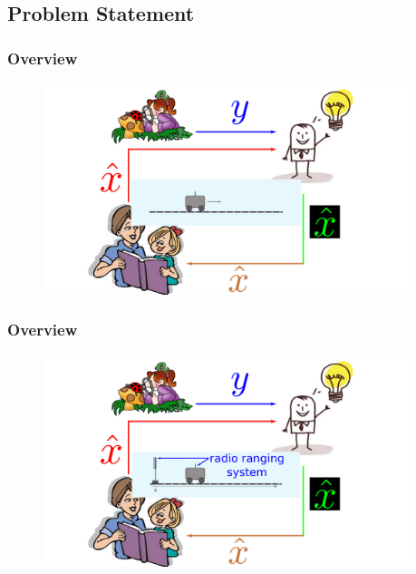 \subsection{Problem Statement}
\begin{frame}\pw\Large
\frametitle{Overview}
\framesubtitle{}
\begin{figure}
\includegraphics[width=0.95\textwidth]{figs/WFAR11_UCP_Update_Prediction_2_ProblemStatement-1.pdf}
\end{figure}
\end{frame}



\begin{frame}\pw\Large
\frametitle{Overview}
\framesubtitle{}
\begin{figure}
\includegraphics[width=0.95\textwidth]{figs/WFAR11_UCP_Update_Prediction_2_ProblemStatement-2.pdf}
\end{figure}
\end{frame}





